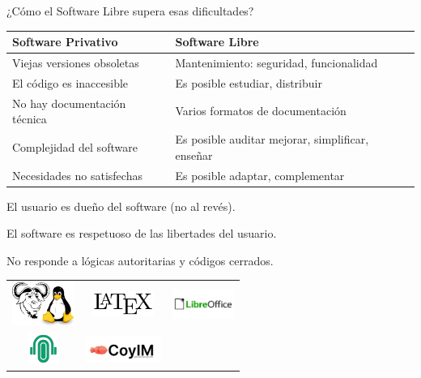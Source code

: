 \documentclass[spanish]{beamer}
\begin{document}
\begin{frame}{¿Cómo el Software Libre supera esas dificultades?}
    \centering
    \resizebox{12cm}{!}
    {
    \begin{tabular}{|l|l|}
        \hline
        \rowcolor{lightgray}\textbf{Software Privativo} & \textbf{Software Libre}\\
        \hline
        \hline
        Viejas versiones obsoletas & Mantenimiento: seguridad, funcionalidad \\
        \hline
        El código es inaccesible & Es posible estudiar, distribuir \\
        \hline
        No hay documentación técnica & Varios formatos de documentación \\
        \hline
        Complejidad del software & Es posible auditar \MVRightArrow{} mejorar, simplificar, enseñar \\
        \hline
        Necesidades no satisfechas & Es posible adaptar, complementar \\
        \hline
    \end{tabular}
    }

    \vspace{0.3cm}
    El usuario es dueño del software (no al revés).

    El software es respetuoso de las libertades del usuario.

    No responde a lógicas autoritarias y códigos cerrados.

    \vspace{0.4cm}


    \begin{tabular}{ccc}
        \includegraphics[width=2cm]{img/GNU_and_Tux.jpg} & \includegraphics[width=2cm]{img/latex.jpg} & \includegraphics[width=2cm]{img/libreoffice.png} \\
        \includegraphics[width=1cm]{img/wahay.jpg} & \includegraphics[width=2.5cm]{img/coyim.jpg} \\
    \end{tabular}

\end{frame}
\end{document}
